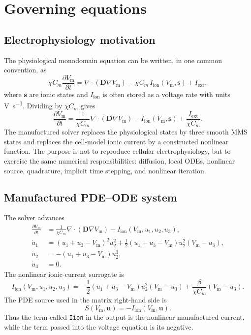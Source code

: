 \documentclass[11pt,a4paper]{article}
\newcommand{\code}[1]{\texttt{\small #1}}
\newcommand{\Vm}{V_{\text{m}}}
\newcommand{\Iion}{I_{\mathrm{ion}}}
\newcommand{\Dten}{\mathbf{D}}
\newcommand{\grad}{\nabla}
\newcommand{\divg}{\nabla\!\cdot}
\begin{document}
\section{Governing equations}

\subsection{Electrophysiology motivation}

The physiological monodomain equation can be written, in one common convention,
as
\begin{equation}
  \chi C_m \frac{\partial \Vm}{\partial t}
  =
  \divg(\Dten \grad \Vm)
  - \chi C_m\,\Iion(\Vm,\mathbf{s})
  + I_{\mathrm{ext}},
  \label{eq:phys-monodomain}
\end{equation}
where $\mathbf{s}$ are ionic states and $\Iion$ is often stored as a voltage
rate with units \si{\volt\per\second}. Dividing by $\chi C_m$ gives
\begin{equation}
  \frac{\partial \Vm}{\partial t}
  =
  \frac{1}{\chi C_m}\divg(\Dten\grad\Vm)
  - \Iion(\Vm,\mathbf{s})
  + \frac{I_{\mathrm{ext}}}{\chi C_m}.
\end{equation}
The manufactured solver replaces the physiological states by three smooth MMS
states and replaces the cell-model ionic current by a constructed nonlinear
function. The purpose is not to reproduce cellular electrophysiology, but to
exercise the same numerical responsibilities: diffusion, local ODEs, nonlinear
source, quadrature, implicit time stepping, and nonlinear iteration.

\subsection{Manufactured PDE--ODE system}

The solver advances
\begin{align}
  \frac{\partial \Vm}{\partial t}
  &=
  \frac{1}{\chi C_m}\divg(\Dten\grad\Vm)
  - \Iion(\Vm,u_1,u_2,u_3),
  \label{eq:mms-pde}\\
  \dot u_1
  &=
  (u_1+u_3-\Vm)^2 u_2^2
  + \frac{1}{2}(u_1+u_3-\Vm)u_2^2(\Vm-u_3),
  \label{eq:mms-u1}\\
  \dot u_2
  &=
  -(u_1+u_3-\Vm)u_2^3,
  \label{eq:mms-u2}\\
  \dot u_3 &= 0.
  \label{eq:mms-u3}
\end{align}
The nonlinear ionic-current surrogate is
\begin{equation}
  \Iion(\Vm,u_1,u_2,u_3)
  =
  -\frac{1}{2}(u_1+u_3-\Vm)u_2^2(\Vm-u_3)
  + \frac{\beta}{\chi C_m}(\Vm-u_3).
  \label{eq:mms-iion}
\end{equation}
The PDE source used in the matrix right-hand side is
\begin{equation}
  S(\Vm,\mathbf{u})=-\Iion(\Vm,\mathbf{u}).
  \label{eq:mms-source}
\end{equation}
Thus the term called \code{Iion} in the output is the nonlinear manufactured
current, while the term passed into the voltage equation is its negative.
\end{document}

